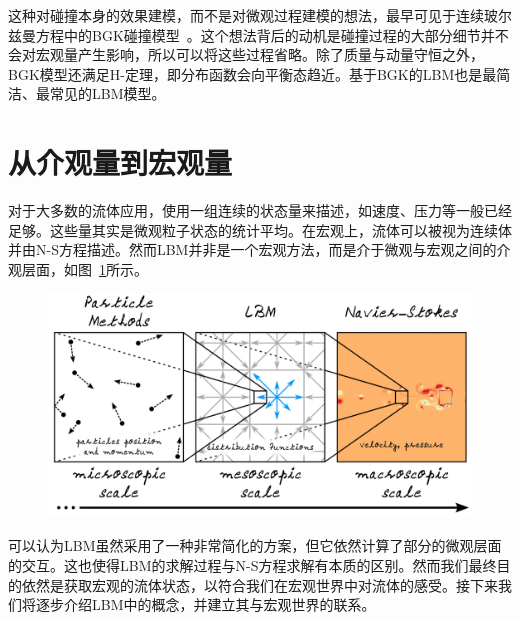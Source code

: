 这种对碰撞本身的效果建模，而不是对微观过程建模的想法，最早可见于连续玻尔兹曼方程中的BGK碰撞模型~\cite{Bhatnagar-1954}。这个想法背后的动机是碰撞过程的大部分细节并不会对宏观量产生影响，所以可以将这些过程省略。除了质量与动量守恒之外，BGK模型还满足$\mathrm{H}$-定理，即分布函数会向平衡态趋近。基于BGK的LBM也是最简洁、最常见的LBM模型。


\section{从介观量到宏观量}
对于大多数的流体应用，使用一组连续的状态量来描述，如速度、压力等一般已经足够。这些量其实是微观粒子状态的统计平均。在宏观上，流体可以被视为连续体并由N-S方程描述。然而LBM并非是一个宏观方法，而是介于微观与宏观之间的介观层面，如图~\ref{img:fluid_abstraction}所示。

\begin{figure}[htb]
    \centering
      \includegraphics[width=0.9\columnwidth]{figures/fluid_abstraction.png}
    \label{img:fluid_abstraction}
\end{figure}

可以认为LBM虽然采用了一种非常简化的方案，但它依然计算了部分的微观层面的交互。这也使得LBM的求解过程与N-S方程求解有本质的区别。然而我们最终目的依然是获取宏观的流体状态，以符合我们在宏观世界中对流体的感受。接下来我们将逐步介绍LBM中的概念，并建立其与宏观世界的联系。

